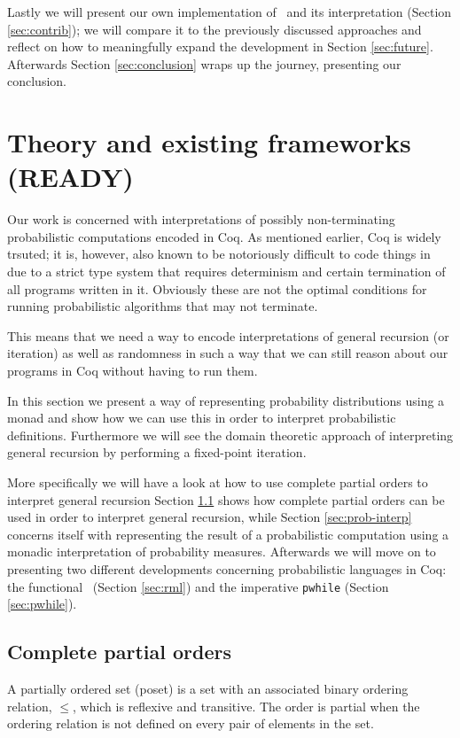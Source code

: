 \documentclass[11pt, leqno, titlepage]{article}
\theoremstyle{definition}
\begin{document}
Lastly we will present our own implementation of \rml\ and its interpretation
(Section \ref{sec:contrib}); we will compare it to the previously discussed
approaches and reflect on how to meaningfully expand the development in Section
\ref{sec:future}. Afterwards Section \ref{sec:conclusion} wraps up the journey,
presenting our conclusion.


\section{Theory and existing frameworks (READY)} 
\label{sec:theory}

Our work is concerned with interpretations of possibly non-terminating probabilistic
computations encoded in Coq. As mentioned earlier, Coq is widely trsuted; it is,
however, also known to be notoriously difficult to code things in due to a strict
type system that requires determinism and certain termination of all programs written
in it. Obviously these are not the optimal conditions for running probabilistic
algorithms that may not terminate.

This means that we need a way to encode interpretations of general recursion (or
iteration) as well as randomness in such a way that we can still reason about our
programs in Coq without having to run them.

In this section we present a way of representing probability distributions using a
monad and show how we can use this in order to interpret probabilistic
definitions. Furthermore we will see the domain theoretic approach of interpreting
general recursion by performing a fixed-point iteration. 

More specifically we will have a look at how to use complete partial orders to
interpret general recursion
Section \ref{sec:cpos} shows how complete partial orders can be used in order to
interpret general recursion, while Section \ref{sec:prob-interp} concerns itself with
representing the result of a probabilistic computation using a monadic interpretation
of probability measures. Afterwards we will move on to presenting two different
developments concerning probabilistic languages in Coq: the functional \rml\ (Section
\ref{sec:rml}) and the imperative \texttt{pwhile} (Section \ref{sec:pwhile}).

\subsection{Complete partial orders}
\label{sec:cpos}
A partially ordered set (poset) is a set with an associated binary ordering relation,
$\leq$, which is reflexive and transitive. The order is partial when the ordering
relation is not defined on every pair of elements in the set.
\end{document}
